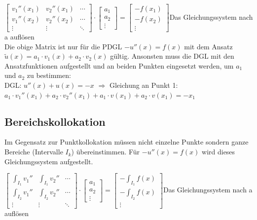 $\begin{bmatrix}
	v_1''(x_1)& v_2''(x_1)&\cdots\\
	v_1''(x_2)& v_2''(x_2)&\cdots\\
	\vdots& \vdots&\ddots
\end{bmatrix}\cdot
\begin{bmatrix}
a_1\\
a_2\\
\vdots
\end{bmatrix}
=\begin{bmatrix}
-f(x_1)\\
-f(x_2)\\
\vdots
\end{bmatrix}$\qquad Das Gleichungssystem nach a auflösen\\

Die obige Matrix ist nur für die PDGL $-u''(x) = f(x)$ mit dem Ansatz
$\tilde{u}(x) = a_1 \cdot v_1(x) + a_2 \cdot v_2(x)$ gültig. Ansonsten muss die
DGL mit den Ansatzfunktionen aufgestellt und an beiden Punkten eingesetzt
werden, um $a_1$ und $a_2$ zu bestimmen:\\
DGL: $u''(x) + u(x) = -x$ $\Rightarrow$ Gleichung an Punkt 1: $a_1 \cdot
v_1''(x_1) + a_2 \cdot v_2''(x_1) + a_1 \cdot v(x_1) + a_2 \cdot v(x_1) = - x_1$




\subsection{Bereichskollokation}
Im Gegensatz zur Punktkollokation müssen nicht einzelne Punkte sondern ganze Bereiche (Intervalle $I_k$) übereinstimmen. Für $-u''(x) = f(x)$ wird dieses Gleichungssystem aufgestellt.

$\begin{bmatrix}
	\int_{I_1} v_1'' & \int_{I_1} v_2''& \cdots\\
	\int_{I_2} v_1'' & \int_{I_2} v_2''& \cdots\\
	\vdots& \vdots&\ddots
\end{bmatrix}\cdot
\begin{bmatrix}
a_1\\
a_2\\
\vdots
\end{bmatrix}
=\begin{bmatrix}
-\int_{I_1} f(x)\\
-\int_{I_2} f(x)\\
\vdots
\end{bmatrix}$\qquad Das Gleichungssystem nach a auflösen


